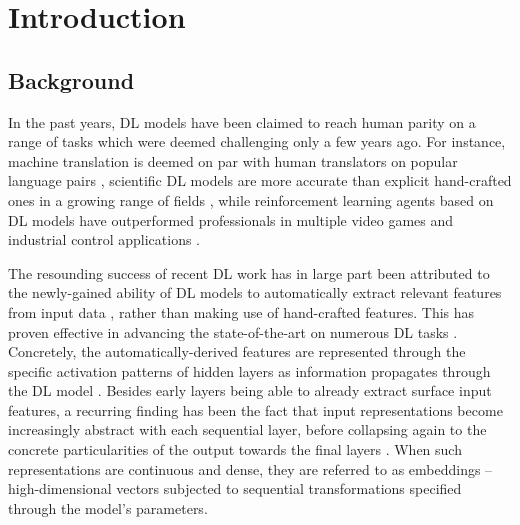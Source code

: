 \section{Introduction}\label{sec:introduction}

\subsection{Background}

In the past years, DL models have been claimed to reach human parity on a range of tasks which were deemed challenging only a few years ago. For instance, machine translation is deemed on par with human translators on popular language pairs \citep{toral_attaining_2018}, scientific DL models are more accurate than explicit hand-crafted ones in a growing range of fields \citep{ravuri_skilful_2021}, while reinforcement learning agents based on DL models have outperformed professionals in multiple video games \citep{schrittwieser_mastering_2020} and industrial control applications \citep{degrave_magnetic_2022}.

The resounding success of recent DL work has in large part been attributed to the newly-gained ability of DL models to automatically extract relevant features from input data \citep{lecun_deep_2015}, rather than making use of hand-crafted features. This has proven effective in advancing the state-of-the-art on numerous DL tasks \citep{radford_learning_2021} \citep{radford_improving_nodate}. Concretely, the automatically-derived features are represented through the specific activation patterns of hidden layers as information propagates through the DL model \citep{lecun_deep_2015}. Besides early layers being able to already extract surface input features, a recurring finding has been the fact that input representations become increasingly abstract with each sequential layer, before collapsing again to the concrete particularities of the output towards the final layers \citep{tenney_bert_2019}. When such representations are continuous and dense, they are referred to as embeddings -- high-dimensional vectors subjected to sequential transformations specified through the model's parameters.

